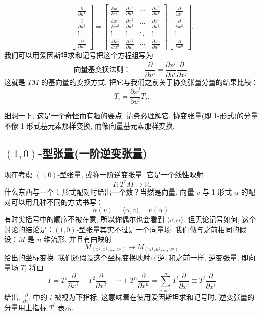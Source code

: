 \[
\begin{bmatrix}\frac{\partial}{\partial u^1}\\\frac{\partial}{\partial u^2}\\\vdots\\\frac{\partial}{\partial u^n}\end{bmatrix}
=
\begin{bmatrix}
\frac{\partial x^1}{\partial u^1}&\frac{\partial x^2}{\partial u^1}&\cdots&\frac{\partial x^n}{\partial u^1}\\
\frac{\partial x^1}{\partial u^2}&\frac{\partial x^2}{\partial u^2}&\cdots&\frac{\partial x^n}{\partial u^2}\\
\vdots&\vdots&\ddots&\vdots\\
\frac{\partial x^1}{\partial u^n}&\frac{\partial x^2}{\partial u^n}&\cdots&\frac{\partial x^n}{\partial u^n}
\end{bmatrix}
\begin{bmatrix}\frac{\partial}{\partial x^1}\\\frac{\partial}{\partial x^2}\\\vdots\\\frac{\partial}{\partial x^n}\end{bmatrix}.
\]
我们可以用爱因斯坦求和记号把这个方程组写为
\[
\text{向量基变换法则：}\qquad \frac{\partial}{\partial u^i}=\frac{\partial x^j}{\partial u^i}\frac{\partial}{\partial x^j}.
\]
这就是 $TM$ 的基向量的变换方式. 把它与我们之前关于协变张量分量的结果比较：
\[
\bar{T}_i=\frac{\partial x^j}{\partial u^i}T_j.
\]
\begin{center}
\end{center}
细想一下, 这是一个奇怪而有趣的要点. 请务必理解它. 协变张量(即 1-形式)的分量不像 1-形式基元素那样变换, 而像向量基元素那样变换.

\subsection{$(1,0)$-型张量(一阶逆变张量)}

现在考虑 $(1,0)$-型张量, 或称一阶逆变张量. 它是一个线性映射
\[
T:T^*M\to\mathbb{R}.
\]
什么东西与一个 1-形式配对时给出一个数？当然是向量. 向量 $v$ 与 1-形式 $\alpha$ 的配对可以用几种不同的方式书写：
\[
\alpha(v)=\langle\alpha,v\rangle=v(\alpha).
\]
有时尖括号中的顺序不被在意, 所以你偶尔也会看到 $\langle v,\alpha\rangle$. 但无论记号如何, 这个讨论的结论是：$(1,0)$-型张量其实不过是一个向量场. 我们做与之前相同的假设：$M$ 是 $n$ 维流形, 并且有由映射
\[
M_{(x^1,x^2,\ldots,x^n)}\longrightarrow M_{(u^1,u^2,\ldots,u^n)}
\]
给出的坐标变换. 我们还假设这个坐标变换映射可逆. 和之前一样, 逆变张量, 即向量场 $T$, 将由
\[
T=T^1\frac{\partial}{\partial x^1}+T^2\frac{\partial}{\partial x^2}+\cdots+T^n\frac{\partial}{\partial x^n}
=\sum_{i=1}^{n}T^i\frac{\partial}{\partial x^i}\equiv T^i\frac{\partial}{\partial x^i}
\]
给出. $\frac{\partial}{\partial x^i}$ 中的 $i$ 被视为下指标, 这意味着在使用爱因斯坦求和记号时, 逆变张量的分量用上指标 $T^i$ 表示.

